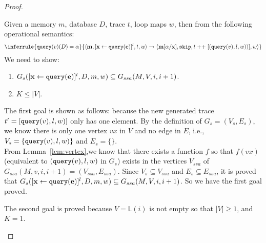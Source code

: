 \documentclass[a4paper,11pt]{article}
\begin{document}
\begin{proof}
\begin{itemize}
Given a memory $m$, database $D$, trace $t$, loop maps $w$, then from the following operational semantics:
\[
\inferrule
{
\query(v)(D) = \qval 
}
{
\config{\ssa{m}, [\assign{\ssa{x}}{\ssa{\query(\expr)}}]^l, t, w} \xrightarrow{} \config{\ssa{m[ \qval/ x]}, \eskip,  t \mathrel{++} [(\query(v),l,w ))],w }
}
\]
We need to show:
\begin{enumerate}
    \item $ G_{s}([\mathrel{ \mathbf{{x}} \leftarrow \mathbf{{{\tt query}(e)}}  }]^{l},D,m,w) \subseteq G_{ssa}(M, V,i, i+1)$.
    \item $K \leq |V| $.
\end{enumerate}
The first goal is shown as follows: because the new generated trace $t'= [{\tt query}(v),l,w)]$ only has one element. By the definition of $G_{s} = (V_s,E_s)$, we know there is only one vertex $vx$ in $V$ and no edge in $E$, 
i.e., $V_s = \{{\tt query}(v),l,w) \}$ and $E_s = \{\}$.
\\
From Lemma~\ref{lem:vertex},we know that there exists a function $f$ so that $f(vx)$ (equivalent to $({\tt query}(v),l,w)$ in $G_s$) exists in the vertices $V_{ssa}$ of $G_{ssa}(M,v,i,i+1) = (V_{ssa}, E_{ssa})$.
Since $V_s \subseteq V_{ssa}$ and $E_s \subseteq E_{ssa}$,
it is proved that $ G_{s}([\mathrel{ \mathbf{{x}} \leftarrow \mathbf{{{\tt query}(e)}}  }]^{l},D,m,w) \subseteq G_{ssa}(M, V,i, i+1)$. So we have the first goal proved.

The second goal is proved because $V= \mathsf{L}(i)$ is not empty so that $|V|\geq 1 $, and $K=1$. \\


\end{itemize}
\end{proof}
\end{document}
